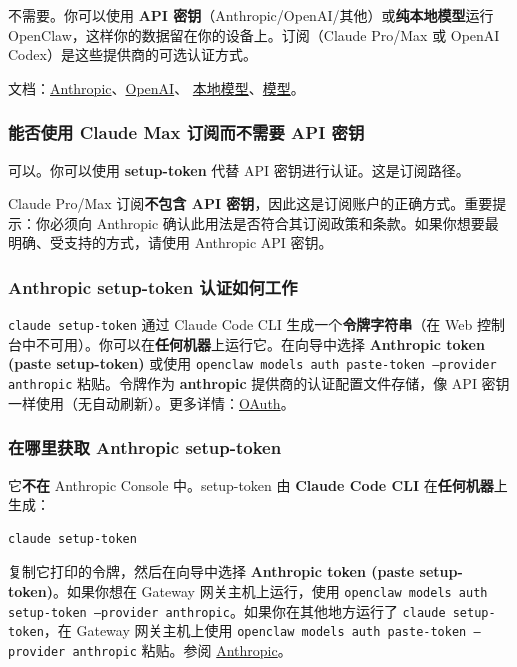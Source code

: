 不需要。你可以使用 \textbf{API 密钥}（Anthropic/OpenAI/其他）或\textbf{纯本地模型}运行 OpenClaw，这样你的数据留在你的设备上。订阅（Claude Pro/Max 或 OpenAI Codex）是这些提供商的可选认证方式。

文档：\href{/providers/anthropic}{Anthropic}、\href{/providers/openai}{OpenAI}、
\href{/gateway/local-models}{本地模型}、\href{/concepts/models}{模型}。

\subsubsection{能否使用 Claude Max 订阅而不需要 API 密钥}


可以。你可以使用 \textbf{setup-token} 代替 API 密钥进行认证。这是订阅路径。

Claude Pro/Max 订阅\textbf{不包含 API 密钥}，因此这是订阅账户的正确方式。重要提示：你必须向 Anthropic 确认此用法是否符合其订阅政策和条款。如果你想要最明确、受支持的方式，请使用 Anthropic API 密钥。

\subsubsection{Anthropic setup-token 认证如何工作}


\texttt{claude setup-token} 通过 Claude Code CLI 生成一个\textbf{令牌字符串}（在 Web 控制台中不可用）。你可以在\textbf{任何机器}上运行它。在向导中选择 \textbf{Anthropic token (paste setup-token)} 或使用 \texttt{openclaw models auth paste-token --provider anthropic} 粘贴。令牌作为 \textbf{anthropic} 提供商的认证配置文件存储，像 API 密钥一样使用（无自动刷新）。更多详情：\href{/concepts/oauth}{OAuth}。

\subsubsection{在哪里获取 Anthropic setup-token}


它\textbf{不在} Anthropic Console 中。setup-token 由 \textbf{Claude Code CLI} 在\textbf{任何机器}上生成：

\begin{lstlisting}[language=bash]
claude setup-token
\end{lstlisting}


复制它打印的令牌，然后在向导中选择 \textbf{Anthropic token (paste setup-token)}。如果你想在 Gateway 网关主机上运行，使用 \texttt{openclaw models auth setup-token --provider anthropic}。如果你在其他地方运行了 \texttt{claude setup-token}，在 Gateway 网关主机上使用 \texttt{openclaw models auth paste-token --provider anthropic} 粘贴。参阅 \href{/providers/anthropic}{Anthropic}。

